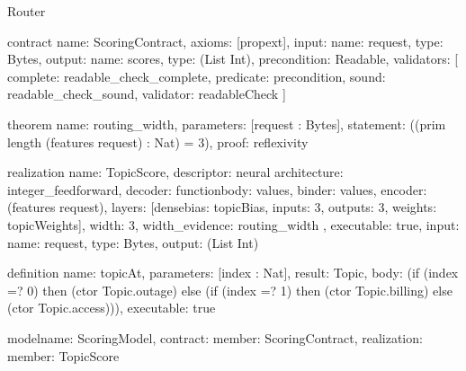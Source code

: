 \begin{lexlean}{Router}
\begin{semanticmodule}
contract{
  name: ScoringContract,
  axioms: [propext],
  input: {name: request, type: Bytes},
  output: {name: scores, type: (List Int)},
  precondition: Readable,
  validators: [
    {
      complete: readable_check_complete,
      predicate: precondition,
      sound: readable_check_sound,
      validator: readableCheck
    }
  ]
}

theorem{
  name: routing_width,
  parameters: [request : Bytes],
  statement: ((prim length (features request) : Nat) = 3),
  proof: reflexivity{}
}

realization{
  name: TopicScore,
  descriptor: neural{
    architecture: integer_feedforward,
    decoder: function{body: values, binder: values},
    encoder: (features request),
    layers: [dense{bias: topicBias, inputs: 3, outputs: 3, weights: topicWeights}],
    width: 3,
    width_evidence: routing_width
  },
  executable: true,
  input: {name: request, type: Bytes},
  output: (List Int)
}

definition{
  name: topicAt,
  parameters: [index : Nat],
  result: Topic,
  body: (if (index =? 0) then (ctor Topic.outage) else (if (index =? 1) then (ctor Topic.billing) else (ctor Topic.access))),
  executable: true
}

model{name: ScoringModel, contract: {member: ScoringContract}, realization: {member: TopicScore}}
\end{semanticmodule}
\end{lexlean}
